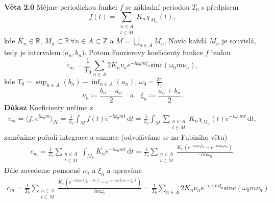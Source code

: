 \documentclass{article}
\begin{document}
\noindent \textbf{Věta 2.0} Mějme periodickou funkci $f$ se základní periodou $T_0$ s předpisem
\[
    f(t) = \sum_{\substack{n \in A \\ t \in M}} K_n \chi_{M_n}(t),
\]
kde $K_n \in \mathbb{R},\,M_n \subset \mathbb{R} \,\forall n \in A \subset \mathbb{Z}$ a $M = \bigcup_{n \in A} M_n$. Navíc každá $M_n$ je souvislá, tedy je intervalem $[a_n,b_n)$. Potom Fourierovy koeficienty funkce $f$ budou
\[
    c_m = \frac{1}{T_0}\sum_{n \in A} 2 K_n \nu_n e^{-i \omega_0 m \xi_n} \text{sinc}(\omega_0 m \nu_n),
\]
kde $T_0 = \sup_{n\in A}(b_n) - \inf_{n\in A}(a_n),\,\omega_0 = \frac{2\pi}{T_0}$
\[
    \nu_n \coloneqq \frac{b_n-a_n}{2}\quad \text{a}\quad \xi_n \coloneqq \frac{a_n+b_n}{2}.
\]
\noindent \textbf{Důkaz}
Koeficienty určíme z
\begin{align*}
    c_m = \langle f, e^{i\omega_0 m}\rangle_\mathcal{H} = \frac{1}{T_0} \int_{M} f(t)e^{-i \omega_0 m t}\,\mathrm{d}t =
\frac{1}{T_0} \int_{M} \sum_{\substack{n \in A \\ t \in M}} K_n \chi_{M_n}(t) e^{-i \omega_0 m t}\,\mathrm{d}t,
\end{align*}
zaměníme pořadí integrace a sumace (odvoláváme se na Fubiniho větu)
\begin{align*}
    c_m =
\frac{1}{T_0} \sum_{\substack{n \in A \\ t \in M}}\int_{M_n} K_n e^{-i \omega_0 m t}\,\mathrm{d}t = \frac{1}{T_0} \sum_{\substack{n \in A \\ t \in M}} \frac{K_n \left(e^{-i m \omega _0 b_n}-e^{ -im \omega _0 a_n}\right)}{-i m \omega _0}.
\end{align*}
Dále zavedeme pomocné $\nu_n$ a $\xi_n$ a upravíme
\begin{align*}
    c_m = \frac{1}{T_0} \sum_{\substack{n \in A \\ t \in M}} \frac{K_n \left(e^{-i m \omega _0 \left(\xi _n-\nu _n\right)}-e^{-i m \omega _0 \left(\nu _n+\xi _n\right)}\right)}{i m \omega _0} = \frac{1}{T_0}\sum_{n \in A} 2 K_n \nu_n e^{-i \omega_0 m \xi_n} \text{sinc}(\omega_0 m \nu_n).
\end{align*}
\flushright{$\square$}
\end{document}
